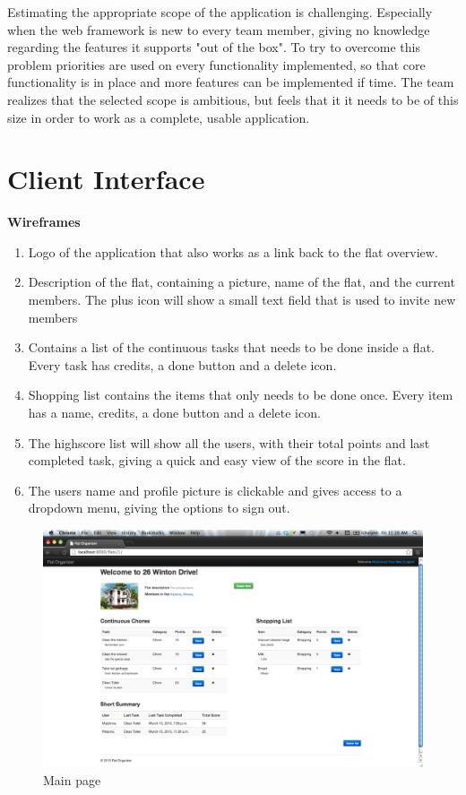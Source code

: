 \documentclass{sig-alt-release2}
\begin{document}
Estimating the appropriate scope of the application is challenging. Especially when the web framework is new to every team member, giving no knowledge regarding the features it supports "out of the box". To try to overcome this problem priorities are used on every functionality implemented, so that core functionality is in place and more features can be implemented if time. The team realizes that the selected scope is ambitious, but feels that it it needs to be of this size in order to work as a complete, usable application.

\section{Client Interface}

\textbf{Wireframes}

\begin{enumerate}
\item Logo of the application that also works as a link back to the flat overview. 
\item Description of the flat, containing a picture, name of the flat, and the current members. The plus icon will show a small text field that is used to invite new members
\item Contains a list of the continuous tasks that needs to be done inside a flat. Every task has credits, a done button and a delete icon. 
\item Shopping list contains the items that only needs to be done once. Every item has a name, credits, a done button and a delete icon. 
\item The highscore list will show all the users, with their total points and last completed task, giving a quick and easy view of the score in the flat. 
\item The users name and profile picture is clickable and gives access to a dropdown menu, giving the options to sign out. 
\end{enumerate}

\begin{figure}[!ht]
\includegraphics[scale=0.2]{tasks}
\caption{Main page}
\label{fig:mainpage}
\end{figure}	
	
\end{document}
